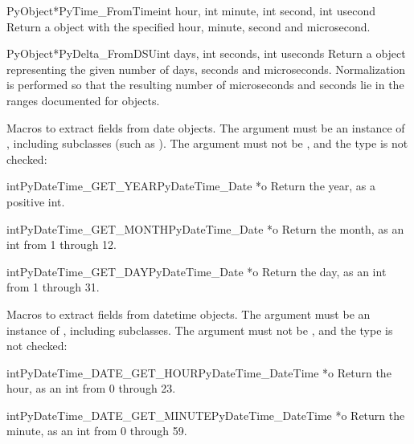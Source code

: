 \begin{cfuncdesc}{PyObject*}{PyTime_FromTime}{int hour, int minute,
        int second, int usecond}
  Return a  object with the specified hour, minute,
  second and microsecond.
\end{cfuncdesc}

\begin{cfuncdesc}{PyObject*}{PyDelta_FromDSU}{int days, int seconds,
        int useconds}
  Return a  object representing the given number
  of days, seconds and microseconds.  Normalization is performed so that
  the resulting number of microseconds and seconds lie in the ranges
  documented for  objects.
\end{cfuncdesc}

Macros to extract fields from date objects.  The argument must be an
instance of , including subclasses (such as
).  The argument must not be \NULL{}, and
the type is not checked:

\begin{cfuncdesc}{int}{PyDateTime_GET_YEAR}{PyDateTime_Date *o}
  Return the year, as a positive int.
\end{cfuncdesc}

\begin{cfuncdesc}{int}{PyDateTime_GET_MONTH}{PyDateTime_Date *o}
  Return the month, as an int from 1 through 12.
\end{cfuncdesc}

\begin{cfuncdesc}{int}{PyDateTime_GET_DAY}{PyDateTime_Date *o}
  Return the day, as an int from 1 through 31.
\end{cfuncdesc}

Macros to extract fields from datetime objects.  The argument must be an
instance of , including subclasses.
The argument must not be \NULL{}, and the type is not checked:

\begin{cfuncdesc}{int}{PyDateTime_DATE_GET_HOUR}{PyDateTime_DateTime *o}
  Return the hour, as an int from 0 through 23.
\end{cfuncdesc}

\begin{cfuncdesc}{int}{PyDateTime_DATE_GET_MINUTE}{PyDateTime_DateTime *o}
  Return the minute, as an int from 0 through 59.
\end{cfuncdesc}

